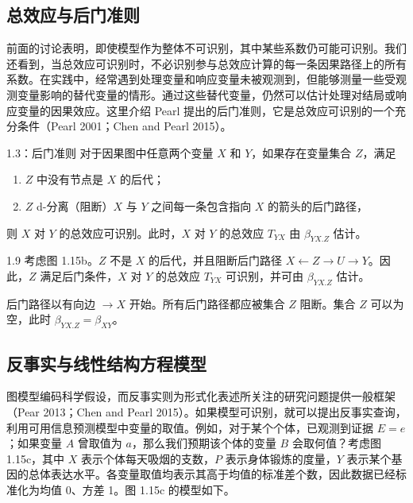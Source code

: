 
\FloatBarrier

\subsection{总效应与后门准则}

前面的讨论表明，即使模型作为整体不可识别，其中某些系数仍可能可识别。我们还看到，当总效应可识别时，不必识别参与总效应计算的每一条因果路径上的所有系数。在实践中，经常遇到处理变量和响应变量未被观测到，但能够测量一些受观测变量影响的替代变量的情形。通过这些替代变量，仍然可以估计处理对结局或响应变量的因果效应。这里介绍 Pearl 提出的后门准则，它是总效应可识别的一个充分条件（Pearl 2001；Chen and Pearl 2015）。

\begin{booktheorem}{1.3：后门准则}
对于因果图中任意两个变量 $X$ 和 $Y$，如果存在变量集合 $Z$，满足
\begin{enumerate}
\item $Z$ 中没有节点是 $X$ 的后代；
\item $Z$ d-分离（阻断）$X$ 与 $Y$ 之间每一条包含指向 $X$ 的箭头的后门路径，
\end{enumerate}
则 $X$ 对 $Y$ 的总效应可识别。此时，$X$ 对 $Y$ 的总效应 $T_{YX}$ 由 $\beta_{YX.Z}$ 估计。
\end{booktheorem}

\begin{bookexample}{1.9}
考虑图 1.15b。$Z$ 不是 $X$ 的后代，并且阻断后门路径 $X\leftarrow Z\to U\to Y$。因此，$Z$ 满足后门条件，$X$ 对 $Y$ 的总效应 $T_{YX}$ 可识别，并可由 $\beta_{YX.Z}$ 估计。

后门路径以有向边 $\to X$ 开始。所有后门路径都应被集合 $Z$ 阻断。集合 $Z$ 可以为空，此时 $\beta_{YX.Z}=\beta_{XY}$。
\end{bookexample}

\subsection{反事实与线性结构方程模型}

图模型编码科学假设，而反事实则为形式化表述所关注的研究问题提供一般框架（Pear 2013；Chen and Pearl 2015）。如果模型可识别，就可以提出反事实查询，利用可用信息预测模型中变量的取值。例如，对于某个个体，已观测到证据 $E=e$；如果变量 $A$ 曾取值为 $a$，那么我们预期该个体的变量 $B$ 会取何值？考虑图 1.15c，其中 $X$ 表示个体每天吸烟的支数，$P$ 表示身体锻炼的度量，$Y$ 表示某个基因的总体表达水平。各变量取值均表示其高于均值的标准差个数，因此数据已经标准化为均值 0、方差 1。图 1.15c 的模型如下。

